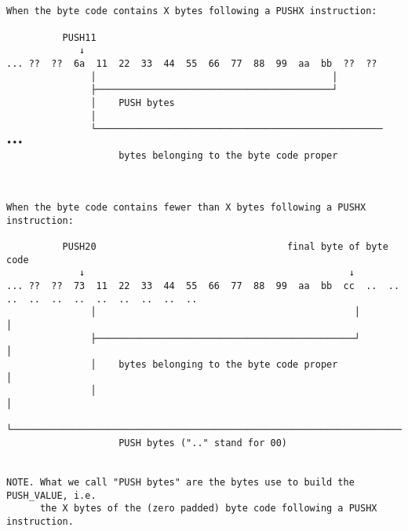\documentclass[varwidth=\maxdimen,margin=0.5cm,multi={verbatim}]{standalone}
\begin{document}
\begin{verbatim}


When the byte code contains X bytes following a PUSHX instruction:

          PUSH11
             ↓
... ??  ??  6a  11  22  33  44  55  66  77  88  99  aa  bb  ??  ??
               │                                          │
               ├──────────────────────────────────────────┘
               │    PUSH bytes
               │
               └───────────────────────────────────────────────────  ∙∙∙
                    bytes belonging to the byte code proper



When the byte code contains fewer than X bytes following a PUSHX instruction:

          PUSH20                                  final byte of byte code
             ↓                                               ↓
... ??  ??  73  11  22  33  44  55  66  77  88  99  aa  bb  cc  ..  ..  ..  ..  ..  ..  ..  ..  ..  ..  ..
               │                                              │                               │
               ├──────────────────────────────────────────────┘                               │
               │    bytes belonging to the byte code proper                                   │
               │                                                                              │
               └──────────────────────────────────────────────────────────────────────────────┘
                    PUSH bytes (".." stand for 00)


NOTE. What we call "PUSH bytes" are the bytes use to build the PUSH_VALUE, i.e.
      the X bytes of the (zero padded) byte code following a PUSHX instruction.

\end{verbatim}
\end{document}
